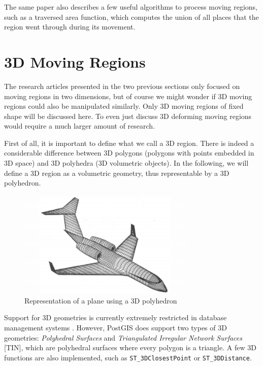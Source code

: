 The same paper \cite{fmregion} also describes a few useful algorithms to process moving regions, such as a traversed area function, which computes the union of all places that the region went through during its movement.

\section{3D Moving Regions}
\label{section:3d_regions_intro}

The research articles presented in the two previous sections only focused on moving regions in two dimensions, but of course we might wonder if 3D moving regions could also be manipulated similarly. Only 3D moving regions of fixed shape will be discussed here. To even just discuss 3D deforming moving regions would require a much larger amount of research.

First of all, it is important to define what we call a 3D region. There is indeed a considerable difference between 3D polygons (polygons with points embedded in 3D space) and 3D polyhedra (3D volumetric objects). In the following, we will define a 3D region as a volumetric geometry, thus representable by a 3D polyhedron.

\begin{figure}[h!]
    \centering
    \includegraphics[width=0.75\textwidth]{images/plane_polyhedron.png}
    \caption[Representation of a plane using a 3D polyhedron]{Representation of a plane using a 3D polyhedron \cite{3d_polyhedron}}
    \label{fig:polyhedron}
\end{figure}


Support for 3D geometries is currently extremely restricted in database management systems \cite{3d_geom}. However, PostGIS does support two types of 3D geometries: \textit{Polyhedral Surfaces} and \textit{Triangulated Irregular Network Surfaces} [TIN], which are polyhedral surfaces where every polygon is a triangle. A few 3D functions are also implemented, such as \lstinline{ST_3DClosestPoint} or \lstinline{ST_3DDistance}.

